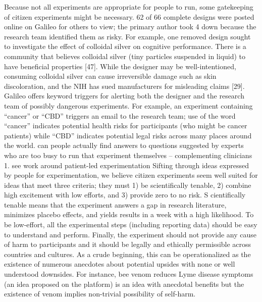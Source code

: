 Because not all experiments are appropriate for people to run, some gatekeeping of citizen experiments might be necessary. 62 of 66 complete designs were posted online on Galileo for others to view; the primary author took 4 down because the research team identified them as risky. For example, one removed design sought to investigate the effect of colloidal silver on cognitive performance. There is a community that believes colloidal silver (tiny particles suspended in liquid) to have beneficial properties [47]. While the designer may be well-intentioned, consuming colloidal silver can cause irreversible damage such as skin discoloration, and the NIH has sued manufacturers for misleading claims [29]. Galileo offers keyword triggers for alerting both the designer and the research team of possibly dangerous experiments. For example, an experiment containing “cancer” or “CBD” triggers an email to the research team; use of the word “cancer” indicates potential health risks for participants (who might be cancer patients) while “CBD” indicates potential legal risks across many places around the world.
can people actually find answers to questions suggested by experts who are too busy to run that experiment themselves -- complementing clinicians 1. see work around patient-led experimentation
Sifting through ideas expressed by people for experimentation, we believe citizen experiments seem well suited for ideas that meet three criteria; they must 1) be scientifically tenable, 2) combine high excitement with low efforts, and 3) provide zero to no risk. S cientifically tenable means that the experiment answers a gap in research literature, minimizes placebo effects, and yields results in a week with a high likelihood. To be low-effort, all the experimental steps (including reporting data) should be easy to understand and perform. Finally, the experiment should not provide any cause of harm to participants and it should be legally and ethically permissible across countries and cultures. As a crude beginning, this can be operationalized as the existence of numerous anecdotes about potential upsides with none or well understood downsides. For instance, bee venom reduces Lyme disease symptoms (an idea proposed on the platform) is an idea with anecdotal benefits but the existence of venom implies non-trivial possibility of self-harm.


